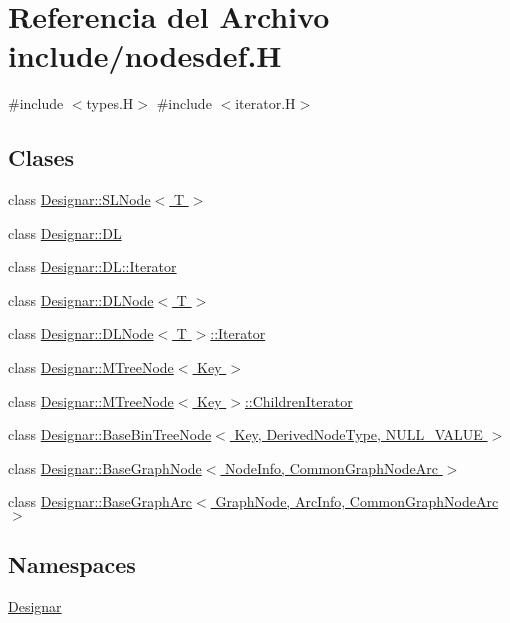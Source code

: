 \hypertarget{nodesdef_8_h}{}\section{Referencia del Archivo include/nodesdef.H}
\label{nodesdef_8_h}
{\ttfamily \#include $<$types.\+H$>$}\newline
{\ttfamily \#include $<$iterator.\+H$>$}\newline
\subsection*{Clases}
\begin{DoxyCompactItemize}
\item 
class \hyperlink{class_designar_1_1_s_l_node}{Designar\+::\+S\+L\+Node$<$ T $>$}
\item 
class \hyperlink{class_designar_1_1_d_l}{Designar\+::\+DL}
\item 
class \hyperlink{class_designar_1_1_d_l_1_1_iterator}{Designar\+::\+D\+L\+::\+Iterator}
\item 
class \hyperlink{class_designar_1_1_d_l_node}{Designar\+::\+D\+L\+Node$<$ T $>$}
\item 
class \hyperlink{class_designar_1_1_d_l_node_1_1_iterator}{Designar\+::\+D\+L\+Node$<$ T $>$\+::\+Iterator}
\item 
class \hyperlink{class_designar_1_1_m_tree_node}{Designar\+::\+M\+Tree\+Node$<$ Key $>$}
\item 
class \hyperlink{class_designar_1_1_m_tree_node_1_1_children_iterator}{Designar\+::\+M\+Tree\+Node$<$ Key $>$\+::\+Children\+Iterator}
\item 
class \hyperlink{class_designar_1_1_base_bin_tree_node}{Designar\+::\+Base\+Bin\+Tree\+Node$<$ Key, Derived\+Node\+Type, N\+U\+L\+L\+\_\+\+V\+A\+L\+U\+E $>$}
\item 
class \hyperlink{class_designar_1_1_base_graph_node}{Designar\+::\+Base\+Graph\+Node$<$ Node\+Info, Common\+Graph\+Node\+Arc $>$}
\item 
class \hyperlink{class_designar_1_1_base_graph_arc}{Designar\+::\+Base\+Graph\+Arc$<$ Graph\+Node, Arc\+Info, Common\+Graph\+Node\+Arc $>$}
\end{DoxyCompactItemize}
\subsection*{Namespaces}
\begin{DoxyCompactItemize}
\item 
 \hyperlink{namespace_designar}{Designar}
\end{DoxyCompactItemize}
